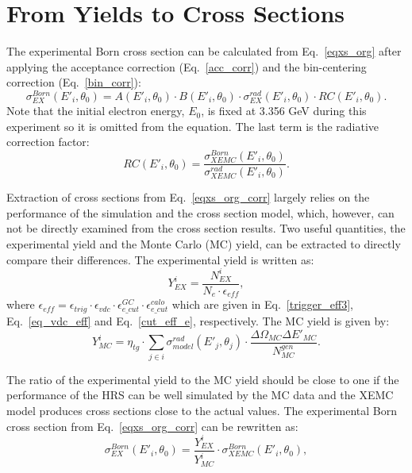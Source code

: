 \section{From Yields to Cross Sections}
The experimental Born cross section can be calculated from Eq.~\eqref{eqxs_org} after applying the acceptance correction (Eq.~\eqref{acc_corr}) and the bin-centering correction (Eq.~\eqref{bin_corr}): 
\begin{equation}
  \sigma^{Born}_{EX} (E'_{i}, \theta_{0}) =  A(E'_{i}, \theta_{0}) \cdot B(E'_{i}, \theta_{0})  \cdot \sigma^{rad}_{EX} (E'_{i}, \theta_{0}) \cdot RC(E'_{i}, \theta_{0}).
  \label{eqxs_org_corr}
\end{equation}
Note that the initial electron energy, $E_{0}$, is fixed at 3.356 GeV during this experiment so it is omitted from the equation. The last term is the radiative correction factor:
\begin{equation}
 RC(E'_{i}, \theta_{0}) = \frac{\sigma^{Born}_{XEMC}(E'_{i},\theta_{0})}{\sigma^{rad}_{XEMC}(E'_{i}, \theta_{0})}.
 \label{eq_radc_fact}
\end{equation}

 Extraction of cross sections from Eq.~\ref{eqxs_org_corr} largely relies on the performance of the simulation and the cross section model, which, however, can not be directly examined from the cross section results. Two useful quantities, the experimental yield and the Monte Carlo (MC) yield, can be extracted to directly compare their differences. The experimental yield is written as:
\begin{equation}
  Y^{i}_{EX} = \frac{N^{i}_{EX}}{N_{e} \cdot \epsilon_{eff}},
  \label{eqyex}
\end{equation}
where $\epsilon_{eff}=\epsilon_{trig}\cdot\epsilon_{vdc}\cdot\epsilon_{e\_cut}^{GC}\cdot\epsilon_{e\_cut}^{calo}$ which are given in Eq.~\eqref{trigger_eff3}, Eq.~\eqref{eq_vdc_eff} and Eq.~\eqref{cut_eff_e}, respectively. The MC yield is given by:
\begin{equation}
  Y^{i}_{MC} = \eta_{tg}\cdot \sum_{j\in i}\sigma^{rad}_{model}(E'_{j},\theta_{j}) \cdot \frac{\Delta\Omega_{MC} \Delta E'_{MC}}{N_{MC}^{gen}}.
  \label{eqymc}
\end{equation}

 The ratio of the experimental yield to the MC yield should be close to one if the performance of the HRS can be well simulated by the MC data and the XEMC model produces cross sections close to the actual values. The experimental Born cross section from Eq.~\ref{eqxs_org_corr} can be rewritten as:
\begin{equation}
  \sigma^{Born}_{EX}(E'_{i}, \theta_{0}) = \frac{ Y^{i}_{EX}}{Y^{i}_{MC}} \cdot \sigma^{Born}_{XEMC}(E'_{i}, \theta_{0}),
  \label{eqxs_ratio}
\end{equation}

